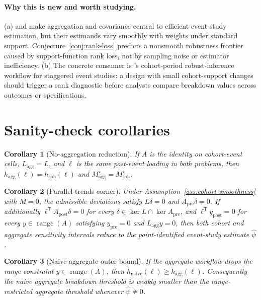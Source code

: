 \documentclass[11pt]{article}
\newcommand{\transpose}{\mathsf{T}}
\theoremstyle{definition}
\theoremstyle{plain}
\newtheorem{corollary}{Corollary}
\theoremstyle{remark}
\begin{document}
\paragraph{Why this is new and worth studying.}
(a) \citet{borusyak2024eventstudy} and \citet{rothsantanna2023efficient} make aggregation and covariance central to efficient event-study estimation, but their estimands vary smoothly with weights under standard support.
Conjecture~\ref{conj:rank-loss} predicts a nonsmooth robustness frontier caused by support-function rank loss, not by sampling noise or estimator inefficiency.
(b) The concrete consumer is \citet{liu2025cohortanchored}'s cohort-period robust-inference workflow for staggered event studies: a design with small cohort-support changes should trigger a rank diagnostic before analysts compare breakdown values across outcomes or specifications.

\section{Sanity-check corollaries}
\begin{corollary}[No-aggregation reduction]\label{cor:no-aggregation}
If \(A\) is the identity on cohort-event cells, \(L_{\mathrm{agg}}=L\), and \(\ell\) is the same post-event loading in both problems, then \(h_{\mathrm{agg}}(\ell)=h_{\mathrm{coh}}(\ell)\) and \(M_{\mathrm{agg}}^\star=M_{\mathrm{coh}}^\star\).
\end{corollary}

\begin{corollary}[Parallel-trends corner]\label{cor:zero-budget}
Under Assumption~\ref{ass:cohort-smoothness} with \(M=0\), the admissible deviations satisfy \(L\delta=0\) and \(A_{\mathrm{pre}}\delta=0\).
If additionally \(\ell^\transpose A_{\mathrm{post}}\delta=0\) for every \(\delta\in\ker L\cap\ker A_{\mathrm{pre}}\), and \(\ell^\transpose y_{\mathrm{post}}=0\) for every \(y\in\operatorname{range}(A)\) satisfying \(y_{\mathrm{pre}}=0\) and \(L_{\mathrm{agg}}y=0\), then both cohort and aggregate sensitivity intervals reduce to the point-identified event-study estimate \(\hat\psi\).
\end{corollary}

\begin{corollary}[Naive aggregate outer bound]\label{cor:naive}
If the aggregate workflow drops the range constraint \(y\in\operatorname{range}(A)\), then \(h_{\mathrm{naive}}(\ell)\ge h_{\mathrm{agg}}(\ell)\).  Consequently the naive aggregate breakdown threshold is weakly smaller than the range-restricted aggregate threshold whenever \(\hat\psi\ne0\).
\end{corollary}
\end{document}

